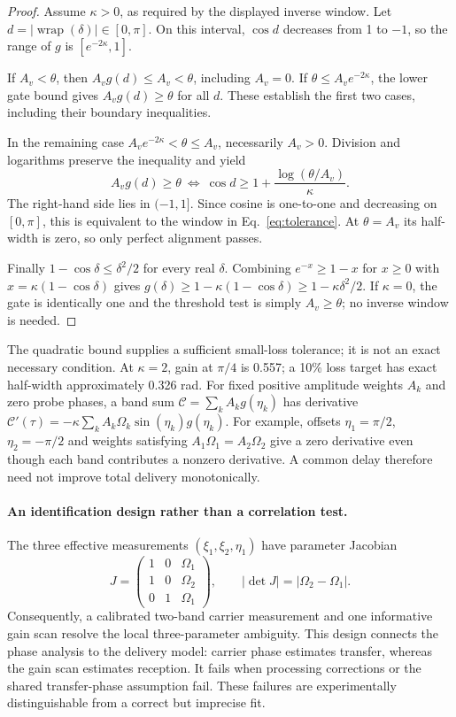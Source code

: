 \documentclass[submission,nolinenumbers]{esj}
\newcommand{\wrap}{\operatorname{wrap}}
\begin{document}
\begin{proof}
Assume $\kappa>0$, as required by the displayed inverse window. Let $d=|\wrap(\delta)|\in[0,\pi]$. On this interval, $\cos d$ decreases from 1 to $-1$, so the range of $g$ is $[e^{-2\kappa},1]$.

If $A_v<\theta$, then $A_vg(d)\le A_v<\theta$, including $A_v=0$. If $\theta\le A_ve^{-2\kappa}$, the lower gate bound gives $A_vg(d)\ge\theta$ for all $d$. These establish the first two cases, including their boundary inequalities.

In the remaining case $A_ve^{-2\kappa}<\theta\le A_v$, necessarily $A_v>0$. Division and logarithms preserve the inequality and yield
\[
A_vg(d)\ge\theta\ \Longleftrightarrow\
\cos d\ge1+\frac{\log(\theta/A_v)}{\kappa}.
\]
The right-hand side lies in $(-1,1]$. Since cosine is one-to-one and decreasing on $[0,\pi]$, this is equivalent to the window in Eq.~\eqref{eq:tolerance}. At $\theta=A_v$ its half-width is zero, so only perfect alignment passes.

Finally $1-\cos\delta\le\delta^2/2$ for every real $\delta$. Combining $e^{-x}\ge1-x$ for $x\ge0$ with $x=\kappa(1-\cos\delta)$ gives $g(\delta)\ge1-\kappa(1-\cos\delta)\ge1-\kappa\delta^2/2$. If $\kappa=0$, the gate is identically one and the threshold test is simply $A_v\ge\theta$; no inverse window is needed.
\end{proof}
The quadratic bound supplies a sufficient small-loss tolerance; it is not an exact necessary condition. At $\kappa=2$, gain at $\pi/4$ is 0.557; a 10\% loss target has exact half-width approximately 0.326 rad. For fixed positive amplitude weights $A_k$ and zero probe phases, a band sum $\mathcal C=\sum_k A_kg(\eta_k)$ has derivative $\mathcal C'(\tau)=-\kappa\sum_k A_k\Omega_k\sin(\eta_k)g(\eta_k)$. For example, offsets $\eta_1=\pi/2$, $\eta_2=-\pi/2$ and weights satisfying $A_1\Omega_1=A_2\Omega_2$ give a zero derivative even though each band contributes a nonzero derivative. A common delay therefore need not improve total delivery monotonically.

\paragraph{An identification design rather than a correlation test.}
The three effective measurements $(\xi_1,\xi_2,\eta_1)$ have parameter Jacobian
\begin{equation}
J=\begin{pmatrix}1&0&\Omega_1\\1&0&\Omega_2\\0&1&\Omega_1\end{pmatrix},
\qquad |\det J|=|\Omega_2-\Omega_1|.\label{eq:jointdesign}
\end{equation}
Consequently, a calibrated two-band carrier measurement and one informative gain scan resolve the local three-parameter ambiguity. This design connects the phase analysis to the delivery model: carrier phase estimates transfer, whereas the gain scan estimates reception. It fails when processing corrections or the shared transfer-phase assumption fail. These failures are experimentally distinguishable from a correct but imprecise fit.
\end{document}
